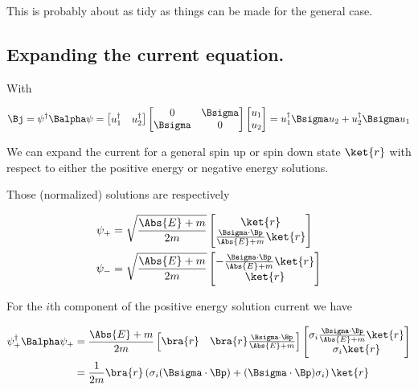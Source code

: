This is probably about as tidy as things can be made for the general case.

\subsection{Expanding the current equation.}

With 

\begin{equation}\label{eqn:desaiDiracAdjoint:720}
\Bj = \psi^\dagger \Balpha \psi = 
\begin{bmatrix}
u_1^\dagger & u_2^\dagger
\end{bmatrix}
\begin{bmatrix}
0 & \Bsigma \\
\Bsigma & 0 
\end{bmatrix}
\begin{bmatrix}
u_1 \\
u_2
\end{bmatrix}
= u_1^\dagger \Bsigma u_2 + u_2^\dagger \Bsigma u_1
\end{equation}

We can expand the current for a general spin up or spin down state $\ket{r}$ with respect to either the positive energy or negative energy solutions.

Those (normalized) solutions are respectively

\begin{align}\label{eqn:desaiDiracAdjoint:740}
\psi_{+} 
&=
\sqrt{\frac{\Abs{E} + m}{2m}}
\begin{bmatrix}
\ket{r} \\
\frac{\Bsigma \cdot \Bp}{\Abs{E}+ m} \ket{r} \\
\end{bmatrix} \\
\psi_{-} 
&=
\sqrt{\frac{\Abs{E} + m}{2m}}
\begin{bmatrix}
-\frac{\Bsigma \cdot \Bp}{\Abs{E}+ m} \ket{r} \\
\ket{r} \\
\end{bmatrix}
\end{align}

For the $i$th component of the positive energy solution current we have

\begin{align*}
\psi_{+}^\dagger \Balpha \psi_{+}
&=
\frac{\Abs{E} + m}{2m}
\begin{bmatrix}
\bra{r} & \bra{r} \frac{\Bsigma \cdot \Bp}{\Abs{E} + m}
\end{bmatrix}
\begin{bmatrix}
\sigma_i \frac{\Bsigma \cdot \Bp}{\Abs{E} + m} \ket{r} \\
\sigma_i \ket{r}
\end{bmatrix} \\
&=
\frac{1}{2m}
\bra{r} \left(
\sigma_i (\Bsigma \cdot \Bp)
+
(\Bsigma \cdot \Bp) \sigma_i 
\right) \ket{r}
\end{align*}

